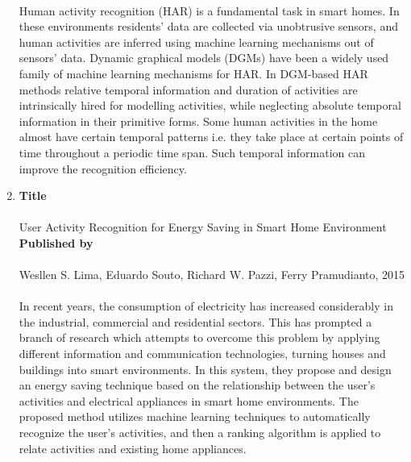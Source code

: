 \begin{enumerate}
			\paragraph{}Human activity recognition (HAR) is a fundamental task in smart homes. In these environments residents’ data are collected via unobtrusive sensors, and human activities are inferred using machine learning mechanisms out of sensors’ data. Dynamic graphical models (DGMs) have been a widely used family of machine learning mechanisms for HAR. In DGM-based HAR methods relative temporal information and duration of activities are intrinsically hired for modelling activities, while neglecting absolute temporal information in their primitive forms. Some human activities in the home almost have certain temporal patterns i.e. they take place at certain points of time throughout a periodic time span. Such temporal information can improve the recognition efficiency.\\

	\item
		\textbf{Title}
			\paragraph{}User Activity Recognition for Energy Saving in Smart Home Environment\\
		
		\textbf{Published by}
			\paragraph{}Wesllen S. Lima, Eduardo Souto, Richard W. Pazzi, Ferry Pramudianto, 2015
			\paragraph{}In recent years, the consumption of electricity has increased considerably in the industrial, commercial and residential sectors. This has prompted a branch of research which attempts to overcome this problem by applying different information and communication technologies, turning houses and buildings into smart environments. In this system, they propose and design an energy saving technique based on the relationship between the user's activities and electrical appliances in smart home environments. The proposed method utilizes machine learning techniques to automatically recognize the user's activities, and then a ranking algorithm is applied to relate activities and existing home appliances.\\


\end{enumerate}
